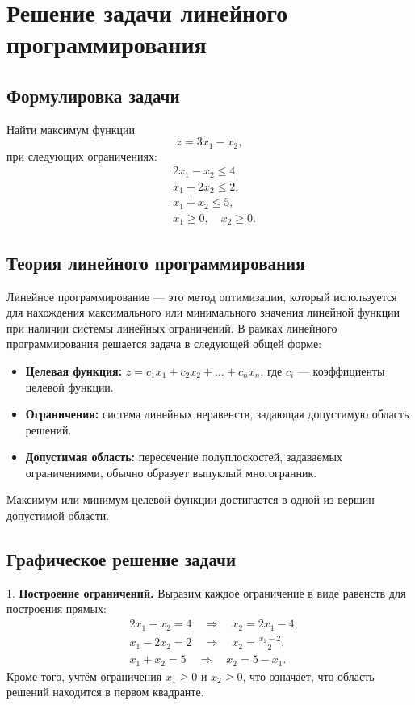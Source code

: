 \documentclass[a4paper,12pt]{article}
\begin{document}
\section*{Решение задачи линейного программирования}

\subsection*{Формулировка задачи}
Найти максимум функции 
\[
z = 3x_1 - x_2,
\]
при следующих ограничениях:
\[
\begin{aligned}
    &2x_1 - x_2 \leq 4, \\
    &x_1 - 2x_2 \leq 2, \\
    &x_1 + x_2 \leq 5, \\
    &x_1 \geq 0, \quad x_2 \geq 0.
\end{aligned}
\]

\subsection*{Теория линейного программирования}
Линейное программирование — это метод оптимизации, который используется для нахождения максимального или минимального значения линейной функции при наличии системы линейных ограничений. В рамках линейного программирования решается задача в следующей общей форме:
\begin{itemize}
    \item \textbf{Целевая функция:} $z = c_1x_1 + c_2x_2 + \dots + c_nx_n$, где $c_i$ — коэффициенты целевой функции.
    \item \textbf{Ограничения:} система линейных неравенств, задающая допустимую область решений.
    \item \textbf{Допустимая область:} пересечение полуплоскостей, задаваемых ограничениями, обычно образует выпуклый многогранник.
\end{itemize}
Максимум или минимум целевой функции достигается в одной из вершин допустимой области.

\subsection*{Графическое решение задачи}
1. \textbf{Построение ограничений.} Выразим каждое ограничение в виде равенств для построения прямых:
\[
\begin{aligned}
    &2x_1 - x_2 = 4 \quad \Rightarrow \quad x_2 = 2x_1 - 4, \\
    &x_1 - 2x_2 = 2 \quad \Rightarrow \quad x_2 = \frac{x_1 - 2}{2}, \\
    &x_1 + x_2 = 5 \quad \Rightarrow \quad x_2 = 5 - x_1.
\end{aligned}
\]
Кроме того, учтём ограничения $x_1 \geq 0$ и $x_2 \geq 0$, что означает, что область решений находится в первом квадранте.
\end{document}

